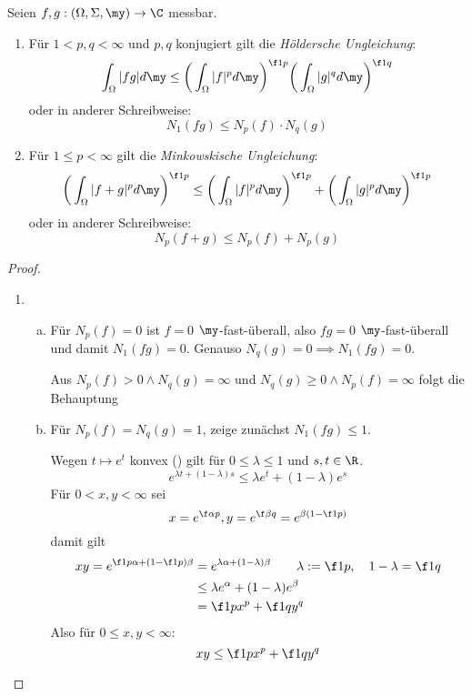 \documentclass{mycourse}
\begin{document}
\begin{st} \label{2.7}
	Seien $f,g : (\Omega, \Sigma, \my) \to \C$ messbar.
	\begin{enumerate}[1)]
		\item
			Für $1 < p,q < \infty$ und $p,q$ konjugiert gilt die \emph{Höldersche Ungleichung}:
			\[
				\int_{\Omega} |fg| d\my \le \bigg(\int_{\Omega}|f|^p d\my \bigg)^{\f 1p} \bigg( \int_{\Omega} |g|^q d\my \bigg)^{\f 1q}
			\]
			oder in anderer Schreibweise:
			\[
				N_1(fg) \le N_p(f) \cdot N_q(g)
			\]
		\item
			Für $1 \le p < \infty$ gilt die \emph{Minkowskische Ungleichung}:
			\[
				\bigg( \int_{\Omega} |f+g|^p d\my \bigg)^{\f 1p} \le  \bigg(\int_{\Omega} |f|^p d\my\bigg)^{\f 1p} + \bigg( \int_{\Omega} |g|^p d\my \bigg)^{\f 1p}
			\]
			oder in anderer Schreibweise:
			\[
				N_p(f+g) \le N_p(f) + N_p(g)
			\]
	\end{enumerate}
	\begin{proof}
		\begin{enumerate}[1)]
			\item
				\begin{enumerate}[a)]
					\item
						Für $N_p(f) = 0$ ist $f =0 $ $\my$-fast-überall, also $fg = 0$ $\my$-fast-überall und damit $N_1(fg) = 0$.
						Genauso $N_q(g) = 0 \implies N_1(fg) = 0$.

						Aus $N_p(f) > 0 \land N_q(g) = \infty$ und $N_q(g) \ge 0 \land N_p(f) = \infty$ folgt die Behauptung
					\item
						Für $N_p(f) = N_q(g) = 1$, zeige zunächst $N_1(fg) \le 1$.

						Wegen $t \mapsto e^t$ konvex (\fixme[Zeichnung]) gilt für $0 \le \lambda \le 1$ und $s,t \in \R$.
						\[
							e^{\lambda t + (1-\lambda)s} \le \lambda e^t + (1-\lambda)e^s
						\]
						Für $0 < x,y < \infty$ sei
						\[
							x = e^{\f \alpha p}, y = e^{\f \beta q} = e^{\beta (1 - \f 1p)}
						\]
						damit gilt
						\begin{align*}
							xy = e^{\f 1p \alpha + (1-\f 1p)\beta} 
							&= e^{\lambda \alpha + (1-\lambda) \beta} \qquad \lambda := \f 1p, \quad 1-\lambda = \f 1q \\
							&\le \lambda e^{\alpha}  + (1-\lambda) e^{\beta} \\
							&= \f 1p x^p + \f 1q y^q
						\end{align*}
						Also für $0 \le x,y < \infty$:
						\[
							xy \le \f 1p x^p + \f 1q y^q
						\]


\end{enumerate}
\end{enumerate}
\end{proof}
\end{st}
\end{document}
